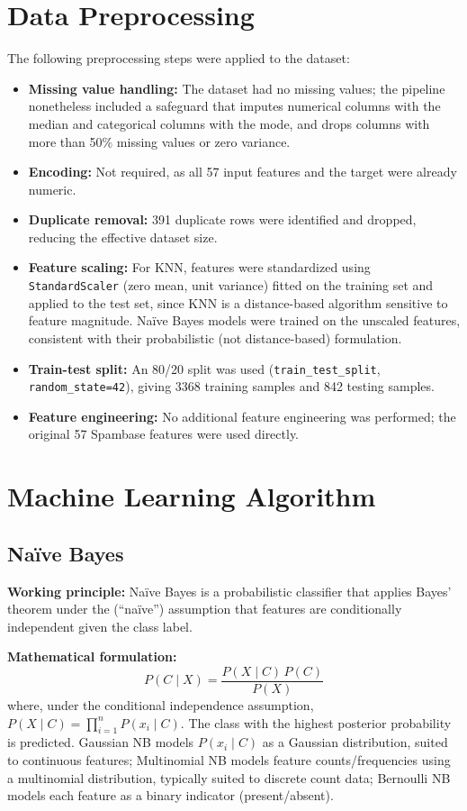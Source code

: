 \documentclass[12pt,a4paper]{article}
\begin{document}
\section{Data Preprocessing}
The following preprocessing steps were applied to the dataset:
\begin{itemize}
\item \textbf{Missing value handling:} The dataset had no missing values; the pipeline nonetheless included a safeguard that imputes numerical columns with the median and categorical columns with the mode, and drops columns with more than 50\% missing values or zero variance.
\item \textbf{Encoding:} Not required, as all 57 input features and the target were already numeric.
\item \textbf{Duplicate removal:} 391 duplicate rows were identified and dropped, reducing the effective dataset size.
\item \textbf{Feature scaling:} For KNN, features were standardized using \texttt{StandardScaler} (zero mean, unit variance) fitted on the training set and applied to the test set, since KNN is a distance-based algorithm sensitive to feature magnitude. Na\"ive Bayes models were trained on the unscaled features, consistent with their probabilistic (not distance-based) formulation.
\item \textbf{Train-test split:} An 80/20 split was used (\texttt{train\_test\_split}, \texttt{random\_state=42}), giving 3368 training samples and 842 testing samples.
\item \textbf{Feature engineering:} No additional feature engineering was performed; the original 57 Spambase features were used directly.
\end{itemize}

\section{Machine Learning Algorithm}

\subsection*{Na\"ive Bayes}
\textbf{Working principle:} Na\"ive Bayes is a probabilistic classifier that applies Bayes' theorem under the (``na\"ive'') assumption that features are conditionally independent given the class label.

\textbf{Mathematical formulation:}
\begin{equation}
P(C \mid X) = \frac{P(X \mid C)\,P(C)}{P(X)}
\end{equation}
where, under the conditional independence assumption, $P(X \mid C) = \prod_{i=1}^{n} P(x_i \mid C)$. The class with the highest posterior probability is predicted. Gaussian NB models $P(x_i \mid C)$ as a Gaussian distribution, suited to continuous features; Multinomial NB models feature counts/frequencies using a multinomial distribution, typically suited to discrete count data; Bernoulli NB models each feature as a binary indicator (present/absent).
\end{document}
